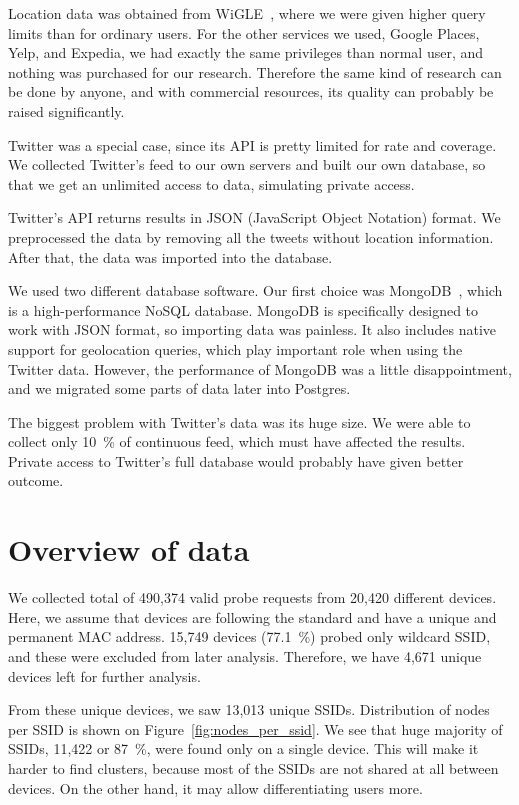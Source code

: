 \documentclass[12pt,a4paper,oneside,pdftex]{report}
\begin{document}
Location data was obtained from WiGLE~\cite{wigle}, where we were given higher query limits than for ordinary users. For the other services we used, Google Places, Yelp, and Expedia, we had exactly the same privileges than normal user, and nothing was purchased for our research. Therefore the same kind of research can be done by anyone, and with commercial resources, its quality can probably be raised significantly.

Twitter was a special case, since its API is pretty limited for rate and coverage. We collected Twitter's feed to our own servers and built our own database, so that we get an unlimited access to data, simulating private access. 

Twitter's API returns results in JSON (JavaScript Object Notation) format. We preprocessed the data by removing all the tweets without location information. After that, the data was imported into the database.

We used two different database software. Our first choice was MongoDB~\cite{mongodb}, which is a high-performance NoSQL database. MongoDB is specifically designed to work with JSON format, so importing data was painless. It also includes native support for geolocation queries, which play important role when using the Twitter data. However, the performance of MongoDB was a little disappointment, and we migrated some parts of data later into Postgres.

The biggest problem with Twitter's data was its huge size. We were able to collect only 10~\% of continuous feed, which must have affected the results. Private access to Twitter's full database would probably have given better outcome.

\section{Overview of data}
\label{sec:data_overview}

We collected total of 490,374 valid probe requests from 20,420 different devices. Here, we assume that devices are following the standard and have a unique and permanent MAC address. 15,749 devices (77.1~\%) probed only wildcard SSID, and these were excluded from later analysis. Therefore, we have 4,671 unique devices left for further analysis.

From these unique devices, we saw 13,013 unique SSIDs. Distribution of nodes per SSID is shown on Figure~\ref{fig:nodes_per_ssid}. We see that huge majority of SSIDs, 11,422 or 87~\%, were found only on a single device. This will make it harder to find clusters, because most of the SSIDs are not shared at all between devices. On the other hand, it may allow differentiating users more.
\end{document}
